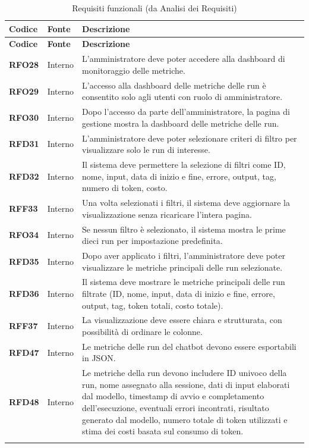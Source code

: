 \documentclass{article}
\begin{document}
    \begin{longtable}{|>{\centering\arraybackslash}m{}|>{\centering\arraybackslash}m{}|>{\arraybackslash}m{}|}
    	\hline
    	\textbf{Codice} & \textbf{Fonte} & \textbf{Descrizione}\\\hline
    	\endfirsthead
    	\hline
    	\textbf{Codice} & \textbf{Fonte} & \textbf{Descrizione}\\\hline
    	\endhead
    	\hline
    	\textbf{RFO28} & Interno 			& L'amministratore deve poter accedere alla dashboard di monitoraggio delle metriche. \\
    	\hline
    	\textbf{RFO29} & Interno 			& L’accesso alla dashboard delle metriche delle run è consentito solo agli utenti con ruolo di amministratore. \\
    	\hline
    	\textbf{RFO30} & Interno 			& Dopo l’accesso da parte dell'amministratore, la pagina di gestione mostra la dashboard delle metriche delle run. \\
    	\hline
    	\textbf{RFD31} & Interno 			& L’amministratore deve poter selezionare criteri di filtro per visualizzare solo le run di interesse. \\
    	\hline
    	\textbf{RFD32} & Interno 			& Il sistema deve permettere la selezione di filtri come ID, nome, input, data di inizio e fine, errore, output, tag, numero di token, costo. \\
    	\hline
    	\textbf{RFF33} & Interno 			& Una volta selezionati i filtri, il sistema deve aggiornare la visualizzazione senza ricaricare l'intera pagina. \\
    	\hline
    	\textbf{RFO34} & Interno 			& Se nessun filtro è selezionato, il sistema mostra le prime dieci run per impostazione predefinita. \\
    	\hline
    	\textbf{RFD35} & Interno 			& Dopo aver applicato i filtri, l’amministratore deve poter visualizzare le metriche principali delle run selezionate. \\
    	\hline
    	\textbf{RFD36} & Interno 			& Il sistema deve mostrare le metriche principali delle run filtrate (ID, nome, input, data di inizio e fine, errore, output, tag, token totali, costo totale). \\
    	\hline
    	\textbf{RFF37} & Interno 			& La visualizzazione deve essere chiara e strutturata, con possibilità di ordinare le colonne. \\
    	\hline
    	\textbf{RFD47} & Interno 			& Le metriche delle run del chatbot devono essere esportabili in JSON. \\
    	\hline
    	\textbf{RFD48} & Interno 			& Le metriche della run devono includere ID univoco della run, nome assegnato alla sessione, dati di input elaborati dal modello, timestamp di avvio e completamento dell'esecuzione, eventuali errori incontrati, risultato generato dal modello, numero totale di token utilizzati e stima dei costi basata sul consumo di token. \\
    	\hline
    	\caption{Requisiti funzionali (da Analisi dei Requisiti)}
    \end{longtable}
\end{document}
